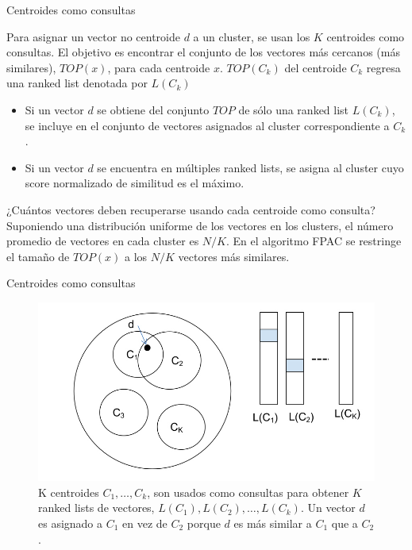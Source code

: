 \begin{frame}{Centroides como consultas}

Para asignar un vector no centroide $d$ a un cluster, se
usan los $K$ centroides como consultas. El objetivo es encontrar el 
conjunto de los vectores más cercanos (más similares), $TOP(x)$,
para cada centroide $x$. $TOP(C_k)$ del
centroide $C_k$ regresa 
una ranked list denotada por $L(C_k)$

\begin{itemize}
    \item Si un vector $d$  se obtiene del conjunto $TOP$ de sólo
una ranked list $L(C_k)$, se incluye en el conjunto de vectores
asignados al cluster correspondiente a $C_k$.
\item Si un vector $d$ se encuentra en múltiples ranked lists, se asigna
al cluster cuyo score normalizado de similitud es el máximo.
\end{itemize}


\begin{block}{¿Cuántos vectores deben recuperarse usando
cada centroide como consulta?}
Suponiendo una distribución uniforme de los 
vectores en los clusters, el número
promedio de vectores en cada cluster es $N/K$.
En el algoritmo FPAC se restringe el tamaño de
$TOP(x)$ a los $N/K$ vectores más similares.
\end{block}
\end{frame}


\begin{frame}{Centroides como consultas}
    \begin{figure}
        \centering
        \includegraphics{img/cluster_example.jpg}
        \caption{K centroides $C_1, \dots, C_k$, son usados como consultas para obtener $K$ ranked lists de vectores, $L(C_1), L(C_2), \dots, L(C_k)$. Un
        vector $d$ es asignado a $C_1$ en vez
        de $C_2$ porque $d$ es más similar a $C_1$ que a $C_2$.}
    \end{figure}
\end{frame}


